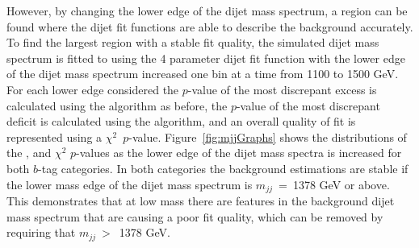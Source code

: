 
However, by changing the lower edge of the dijet mass spectrum,
a region can be found where the dijet fit functions are able to describe the background accurately.
To find the largest region with a stable fit quality, the simulated dijet mass spectrum is
fitted to using the 4 parameter dijet fit function with the lower edge of the dijet mass spectrum increased one bin at a time from 1100 to 1500 GeV.
For each lower edge considered
the \mbox{$p$-value} of the most discrepant excess is calculated using the \bh{} algorithm as before,
the \mbox{$p$-value} of the most discrepant deficit is calculated using the \dhunt{} algorithm,
and an overall quality of fit is represented using a $\chi^{2}$~\mbox{$p$-value}.
Figure~\ref{fig:mjjGraphs} shows the distributions of the
\bh{}, \dhunt{} and $\chi^{2}$ \mbox{$p$-value}s as the lower edge of the dijet mass spectra is increased
for both $b$-tag categories.
In both categories the background estimations are stable if the lower mass edge of the dijet mass spectrum is $m_{jj}$~=~1378 GeV or above.
This demonstrates that at low mass there are features in the background dijet mass spectrum that are causing a poor fit quality,
which can be removed by requiring that $m_{jj}~>$~1378 GeV. 

